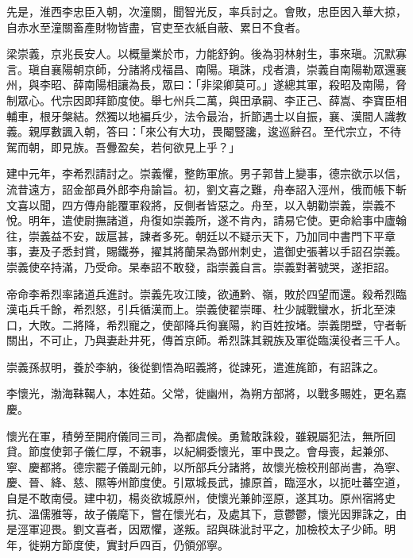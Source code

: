 \begin{pinyinscope}
 先是，淮西李忠臣入朝，次潼關，聞智光反，率兵討之。會敗，忠臣因入華大掠，自赤水至潼關畜產財物皆盡，官吏至衣紙自蔽、累日不食者。



 梁崇義，京兆長安人。以概量業於市，力能舒鉤。後為羽林射生，事來瑱。沉默寡言。瑱自襄陽朝京師，分諸將戍福昌、南陽。瑱誅，戍者潰，崇義自南陽勒眾還襄州，與李昭、薛南陽相讓為長，眾曰：「非梁卿莫可。」遂總其軍，殺昭及南陽，脅制眾心。代宗因即拜節度使。舉七州兵二萬，與田承嗣、李正己、薛嵩、李寶臣相輔車，根牙槃結。然獨以地褊兵少，法令最治，折節遇士以自振，襄、漢間人識教義。親厚數諷入朝，答曰：「來公有大功，畏閹豎讒，逡巡辭召。至代宗立，不待駕而朝，即見族。吾釁盈矣，若何欲見上乎？」



 建中元年，李希烈請討之。崇義懼，整飭軍旅。男子郭昔上變事，德宗欲示以信，流昔遠方，詔金部員外郎李舟諭旨。初，劉文喜之難，舟奉詔入涇州，俄而帳下斬文喜以聞，四方傳舟能覆軍殺將，反側者皆惡之。舟至，以入朝勸崇義，崇義不悅。明年，遣使尉撫諸道，舟復如崇義所，遂不肯內，請易它使。更命給事中廬翰往，崇義益不安，跋扈甚，諫者多死。朝廷以不疑示天下，乃加同中書門下平章事，妻及子悉封賞，賜鐵券，擢其將蘭杲為鄧州刺史，遣御史張著以手詔召崇義。崇義使卒持滿，乃受命。杲奉詔不敢發，詣崇義自言。崇義對著號哭，遂拒詔。



 帝命李希烈率諸道兵進討。崇義先攻江陵，欲通黔、嶺，敗於四望而還。殺希烈臨漢屯兵千餘，希烈怒，引兵循漢而上。崇義使翟崇暉、杜少誠戰蠻水，折北至涑口，大敗。二將降，希烈寵之，使部降兵徇襄陽，約百姓按堵。崇義閉壁，守者斬關出，不可止，乃與妻赴井死，傳首京師。希烈誅其親族及軍從臨漢役者三千人。



 崇義孫叔明，養於李納，後從劉悟為昭義將，從諫死，遣進旄節，有詔誅之。



 李懷光，渤海靺鞨人，本姓茹。父常，徙幽州，為朔方部將，以戰多賜姓，更名嘉慶。



 懷光在軍，積勞至開府儀同三司，為都虞候。勇鷙敢誅殺，雖親屬犯法，無所回貸。節度使郭子儀仁厚，不親事，以紀綱委懷光，軍中畏之。會母喪，起兼邠、寧、慶都將。德宗罷子儀副元帥，以所部兵分諸將，故懷光檢校刑部尚書，為寧、慶、晉、絳、慈、隰等州節度使。引眾城長武，據原首，臨涇水，以扼吐蕃空道，自是不敢南侵。建中初，楊炎欲城原州，使懷光兼帥涇原，遂其功。原州宿將史抗、溫儒雅等，故子儀麾下，嘗在懷光右，及處其下，意鬱鬱，懷光因罪誅之，由是涇軍迎畏。劉文喜者，因眾懼，遂叛。詔與硃泚討平之，加檢校太子少師。明年，徙朔方節度使，實封戶四百，仍領邠寧。




\end{pinyinscope}
